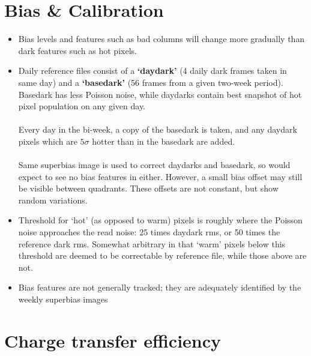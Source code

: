 \documentclass[10pt,fleqn]{article}
\begin{document}
\section{Bias \& Calibration \cite{darkCalibration2004}}

\begin{itemize}

\item Bias levels and features such as bad columns will change more gradually than dark features such as hot pixels. 

\item Daily reference files consist of a \textbf{`daydark'} (4 daily dark frames taken in same day) and a \textbf{`basedark'} (56 frames from a given two-week period). Basedark has less Poisson noise, while daydarks contain best snapshot of hot pixel population on any given day.\\
\\
Every day in the bi-week, a copy of the basedark is taken, and any daydark pixels which are $5\sigma$ hotter than in the basedark are added.\\
\\ Same superbias image is used to correct daydarks and basedark, so would expect to see no bias features in either. However, a small bias offset may still be visible between quadrants. These offsets are not constant, but show random variations.

\item Threshold for `hot' (as opposed to warm) pixels is roughly where the Poisson noise approaches the read noise: 25 times daydark rms, or 50 times the reference dark rms. Somewhat arbitrary in that `warm' pixels below this threshold are deemed to be correctable by reference file, while those above are not.

\item Bias features are not generally tracked; they are adequately identified by the weekly superbias images 
\end{itemize}

\section{Charge transfer efficiency }
\end{document}
